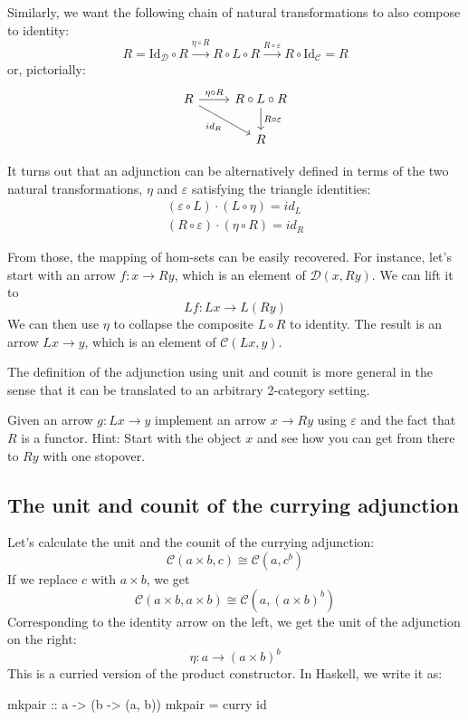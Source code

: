 \documentclass[DaoFP]{subfiles}
\begin{document}
Similarly, we want the following chain of natural transformations to also compose to identity:
\[ R = \text{Id}_{\mathcal{D}} \circ R \xrightarrow{\eta \circ R} R \circ L \circ R \xrightarrow{R \circ \varepsilon} R \circ \text{Id}_{\mathcal{C}} = R \]
or, pictorially:
\[
 \begin{tikzcd}
 R
 \arrow[r, "\eta \circ R"]
 \arrow[rd, "id_R"']
 & R \circ L \circ R
 \arrow[d, "R \circ \varepsilon"]
 \\
 & R
  \end{tikzcd}
\]

It turns out that an adjunction can be alternatively defined in terms of the two natural transformations, $\eta$ and $\varepsilon$ satisfying the  triangle identities:
\begin{align*}
(\varepsilon \circ L) \cdot (L \circ \eta) = id_L \\
(R \circ \varepsilon) \cdot (\eta \circ R) = id_R
\end{align*}

From those, the mapping of hom-sets can be easily recovered. For instance, let's start with an arrow $f \colon x \to R y$, which is an element of $\mathcal{D}( x , R y)$. We can lift it to 
\[L f \colon L x \to L (R y)\]
We can then use $\eta$ to collapse the composite $L \circ R$ to identity. The result is an arrow $L x \to y$, which is an element of $ \mathcal{C} (L x, y)$.


The definition of the adjunction using unit and counit is more general in the sense that it can be translated to an arbitrary 2-category setting. 

\begin{exercise}
Given an arrow $g \colon L x \to y$ implement an arrow $x \to R y$ using $\varepsilon$ and the fact that $R$ is a functor. Hint: Start with the object $x$ and see how you can get from there to $R y$ with one stopover.
\end{exercise}

\subsection{The unit and counit of the currying adjunction}

Let's calculate the unit and the counit of the currying adjunction:
\[  \mathcal{C}(a \times b, c ) \cong  \mathcal{C} (a, c^b)  \]
If we replace $c$ with $a \times b$, we get
\[  \mathcal{C}(a \times b, a \times b ) \cong  \mathcal{C} (a, (a \times b)^b)  \]
Corresponding to the identity arrow on the left, we get the unit of the adjunction on the right:
\[ \eta \colon a \to (a \times b)^b \]
This is a curried version of the product constructor. In Haskell, we write it as:
\begin{haskell}
mkpair :: a -> (b -> (a, b))
mkpair = curry id
\end{haskell}
\end{document}
